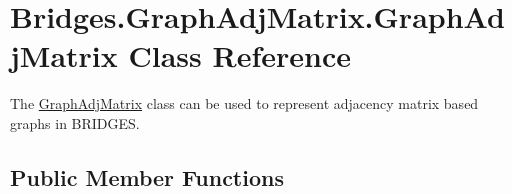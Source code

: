 \hypertarget{class_bridges_1_1_graph_adj_matrix_1_1_graph_adj_matrix}{}\section{Bridges.\+Graph\+Adj\+Matrix.\+Graph\+Adj\+Matrix Class Reference}
\label{class_bridges_1_1_graph_adj_matrix_1_1_graph_adj_matrix}


The \mbox{\hyperlink{class_bridges_1_1_graph_adj_matrix_1_1_graph_adj_matrix}{Graph\+Adj\+Matrix}} class can be used to represent adjacency matrix based graphs in B\+R\+I\+D\+G\+ES.  


\subsection*{Public Member Functions}
